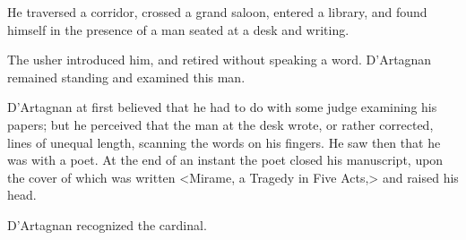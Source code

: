 He traversed a corridor, crossed a grand saloon, entered a library, and found himself in the presence of a man seated at a desk and writing. 

The usher introduced him, and retired without speaking a word. D'Artagnan remained standing and examined this man. 

D'Artagnan at first believed that he had to do with some judge examining his papers; but he perceived that the man at the desk wrote, or rather corrected, lines of unequal length, scanning the words on his fingers. He saw then that he was with a poet. At the end of an instant the poet closed his manuscript, upon the cover of which was written <Mirame, a Tragedy in Five Acts,> and raised his head. 

D'Artagnan recognized the cardinal. 